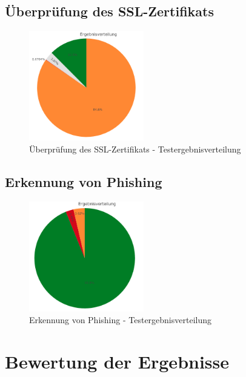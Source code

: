\subsection{Überprüfung des SSL-Zertifikats}
\begin{figure}[H]
  \centering
  \includegraphics[width=5cm]{images/stats/diacertificate}
  \caption{Überprüfung des SSL-Zertifikats - Testergebnisverteilung}
  \label{fig:diacertificate}
\end{figure}

\subsection{Erkennung von Phishing}
\begin{figure}[H]
  \centering
  \includegraphics[width=5cm]{images/stats/diaphishing}
  \caption{Erkennung von Phishing - Testergebnisverteilung}
  \label{fig:diaphishing}
\end{figure}

\section{Bewertung der Ergebnisse}
